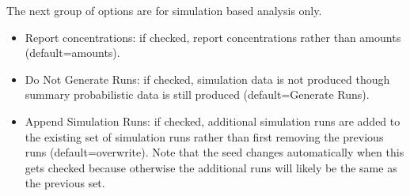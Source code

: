 \documentclass[titlepage,11pt]{article}
\begin{document}
The next group of options are for simulation based analysis only.
\begin{itemize}
\item Report concentrations: if checked, report concentrations rather than amounts (default=amounts).
\item Do Not Generate Runs: if checked, simulation data is not produced though summary probabilistic data is still produced (default=Generate Runs).
\item Append Simulation Runs: if checked, additional simulation runs are added to the existing set of simulation runs rather than first removing the previous runs (default=overwrite).  Note that the seed changes automatically when this gets checked because otherwise the additional runs will likely be the same as the previous set.
\end{itemize} 
\end{document}
